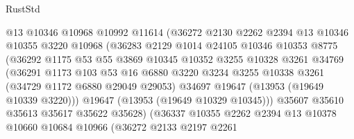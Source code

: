 \begin{lexlean}{RustStd}
\begin{coremodule}
                          @13
                          @10346
                          @10968
                          @10992
                          @11614
                          (@36272
                            @2130
                            @2262
                            @2394
                            @13
                            @10346
                            @10355
                            @3220
                            @10968
                            (@36283
                              @2129
                              @1014
                              @24105
                              @10346
                              @10353
                              @8775
                              (@36292
                                @1175
                                @53
                                @55
                                @3869
                                @10345
                                @10352
                                @3255
                                @10328
                                @3261
                                @34769
                                (@36291
                                  @1173
                                  @103
                                  @53
                                  @16
                                  @6880
                                  @3220
                                  @3234
                                  @3255
                                  @10338
                                  @3261
                                  (@34729 @1172 @6880 @29049 @29053)
                                  @34697
                                  @19647
                                  (@13953 (@19649 @10339 @3220)))
                                @19647
                                (@13953 (@19649 @10329 @10345)))
                              @35607
                              @35610
                              @35613
                              @35617
                              @35622
                              @35628)
                            (@36337
                              @10355
                              @2262
                              @2394
                              @13
                              @10378
                              @10660
                              @10684
                              @10966
                              (@36272
                                @2133
                                @2197
                                @2261

\end{coremodule}
\end{lexlean}
